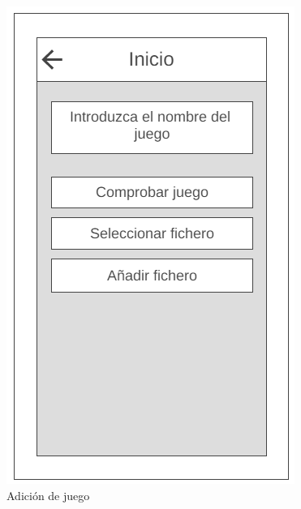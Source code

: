 \begin{figure}[H]
    \centering
    \includegraphics[scale=0.3]{Figures/Mockups/Mock_AnadirJuego.png}
    \caption{Adición de juego}
    \label{AnadirJuego}    
\end{figure}

%
%
%
%

